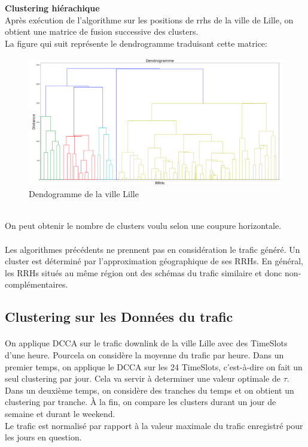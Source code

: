 \documentclass{report}
\begin{document}
\textbf{Clustering hiérachique}\\
Après exécution de l’algorithme sur les positions de rrhs de la ville de Lille, on obtient une matrice
de fusion successive des clusters.\\
La figure qui suit représente le dendrogramme traduisant cette matrice:
\begin{figure}[h]
  \centering
  \includegraphics[width=40em]{images/dendogramme.png}
  \caption{Dendogramme de la ville Lille }
\end{figure}\\
On peut obtenir le nombre de clusters voulu selon une coupure horizontale. 
\paragraph{}
Les algorithmes précédents ne prennent pas en considération le trafic généré. Un cluster est déterminé par l'approximation géographique 
de ses RRHs. En général, les RRHs situés au même région ont des schémas du trafic similaire et donc non-complémentaires. 
\subsection{Clustering sur les Données du trafic}
\paragraph{}
On applique DCCA sur le trafic downlink de la ville Lille avec des TimeSlots d'une heure. Pourcela on considère la moyenne du trafic par heure.
Dans un premier temps, on applique le DCCA sur les 24 TimeSlots, c'est-à-dire on fait un seul clustering par jour. Cela va servir à determiner
une valeur optimale de $\tau$. Dans un deuxième temps, on considère des tranches du temps et on obtient un clustering par tranche. 
À la fin, on compare les clusters durant un jour de semaine et durant le weekend.\\
Le trafic est normalisé par rapport à la valeur maximale du trafic enregistré pour les jours en question.
\end{document}
